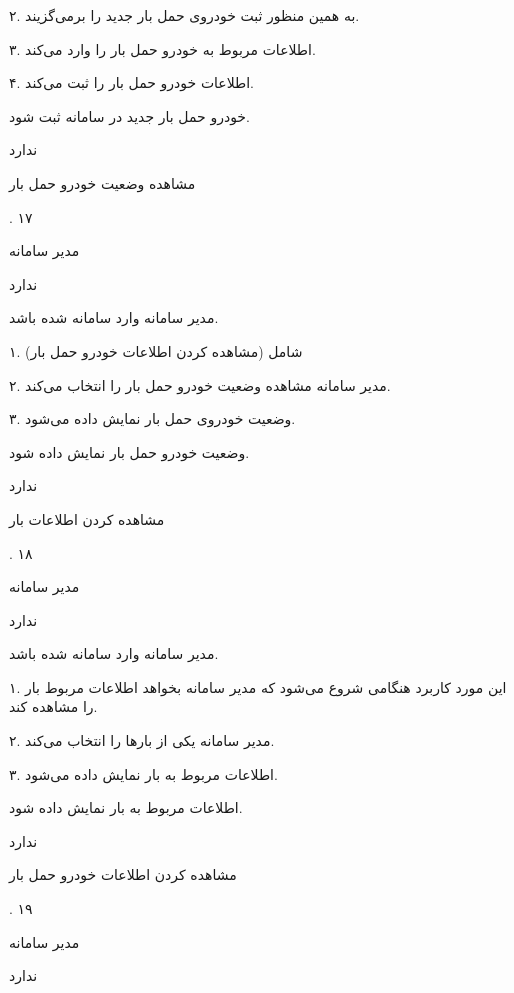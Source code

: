 ۲. به همین منظور ثبت خودروی حمل بار جدید را برمی‌گزیند.

۳. اطلاعات مربوط به خودرو حمل بار را وارد می‌کند.

۴. اطلاعات خودرو حمل بار را ثبت می‌کند.

خودرو حمل بار جدید در سامانه ثبت شود.

ندارد

\newpage

مشاهده وضعیت خودرو حمل بار

.
۱۷

مدیر سامانه

ندارد

مدیر سامانه وارد سامانه شده باشد.


۱. شامل (مشاهده کردن اطلاعات خودرو حمل بار)

۲. مدیر سامانه مشاهده وضعیت خودرو حمل بار را انتخاب می‌کند.

۳. وضعیت خودروی حمل بار نمایش داده می‌شود.

وضعیت خودرو حمل بار نمایش داده شود.

ندارد

\newpage

مشاهده کردن اطلاعات بار

.
۱۸

مدیر سامانه

ندارد

مدیر سامانه وارد سامانه شده باشد.


۱. این مورد کاربرد هنگامی شروع می‌شود که مدیر سامانه بخواهد اطلاعات مربوط بار را مشاهده کند.

۲. مدیر سامانه یکی از بارها را انتخاب می‌کند.

۳. اطلاعات مربوط به بار نمایش داده می‌شود.

اطلاعات مربوط به بار نمایش داده شود.

ندارد

\newpage

مشاهده کردن اطلاعات خودرو حمل بار

.
۱۹

مدیر سامانه

ندارد

